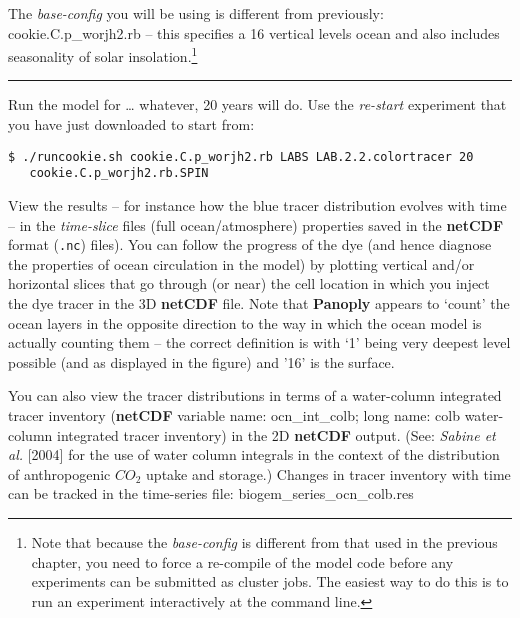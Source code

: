 \vspace{1mm}
The \textit{base-config} you will be using is different from previously: \textsf{\footnotesize cookie.C.p\_worjh2.rb} – this specifies a 16 vertical levels ocean and also includes seasonality of solar insolation.\footnote{Note that because the \textit{base-config} is different from that used in the previous chapter, you need to force a re-compile of the model code before any experiments can be submitted as cluster jobs. The easiest way to do this is to run an experiment interactively at the command line.}

\vspace{1mm}\noindent\rule{4cm}{0.5pt}\vspace{2mm}

\newpage 

\noindent Run the model for … whatever, 20 years will do. Use the \textit{re-start} experiment that you have just downloaded to start from:

\vspace{-2mm}\small\begin{verbatim}
$ ./runcookie.sh cookie.C.p_worjh2.rb LABS LAB.2.2.colortracer 20 
   cookie.C.p_worjh2.rb.SPIN
\end{verbatim}\normalsize\vspace{-2mm}

View the results – for instance how the blue tracer distribution evolves with time – in the \textit{time-slice} files (full ocean/atmosphere) properties saved in the \textbf{netCDF} format (\texttt{.nc}) files). You can follow the progress of the dye (and hence diagnose the properties of ocean circulation in the model) by plotting vertical and/or horizontal slices that go through (or near) the cell location in which you inject the dye tracer in the 3D \textbf{netCDF} file. Note that \textbf{Panoply} appears to ‘count’ the ocean layers in the opposite direction to the way in which the ocean model is actually counting them – the correct definition is with ‘1’ being very deepest level possible (and as displayed in the figure) and '16' is the surface.

You can also view the tracer distributions in terms of a water-column integrated tracer inventory (\textbf{netCDF} variable name: \textsf{\footnotesize ocn\_int\_colb}; long name: \textsf{\footnotesize colb water-column integrated tracer inventory}) in the 2D \textbf{netCDF} output. (See: \textit{Sabine et al.} [2004] for the use of water column integrals in the context of the distribution of anthropogenic \(CO_{2}\) uptake and storage.) Changes in tracer inventory with time can be tracked in the time-series file: \textsf{\footnotesize biogem\_series\_ocn\_colb.res}

